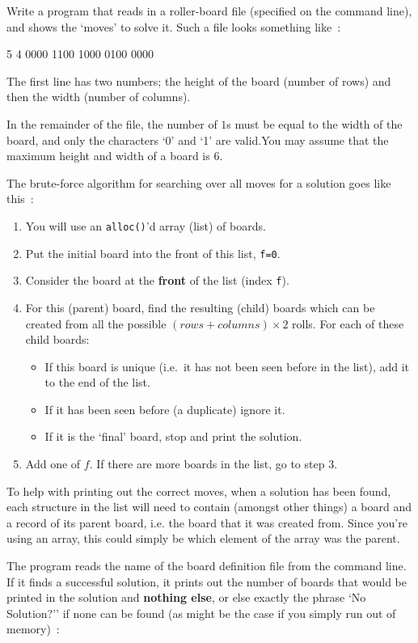 \begin{exercise}
Write a program that reads in a roller-board file (specified on the command line), and shows the `moves' to solve it. Such a file looks something like~:
\begin{terminaloutput}
5 4
0000
1100
1000
0100
0000
\end{terminaloutput}

\noindent The first line has two numbers; the height of
the board (number of rows) and then the width (number of columns).

\noindent
In the remainder of the file, the number of $1$s must be equal to the width of the board, and only the characters `0' and `1' are valid.You may assume that the maximum height and width of a board is $6$.

\noindent
The brute-force algorithm for searching over all moves for a
solution goes like this~:
\begin{enumerate}
\item You will use an \verb^alloc()^'d array (list) of boards.
\item Put the initial board into the front of this list, \verb^f=0^.
\item Consider the board at the {\bf front} of the list (index \verb$f$).
\item For this (parent) board, find the resulting (child) boards 
which can be created from all the possible $(rows + columns) \times 2$ rolls. For each of these child boards:
\begin{itemize}
\item If this board is unique (i.e.\ it has not been seen before in the list), add it to the end of the list.
\item If it has been seen before (a duplicate) ignore it.
\item If it is the `final' board, stop and print the solution.
\end{itemize}
\item Add one of $f$. If there are more boards in the list, go to step $3$.
\end{enumerate}

\noindent To help with printing out the correct moves, when a solution
has been found, each structure in the list will need to contain (amongst
other things) a board and a record of its parent board, i.e. the board
that it was created from. Since you're using an array, this could simply
be which element of the array was the parent.

\noindent The program reads the name of the board definition file from
the command line.  If it finds a successful solution, it prints out the
number of boards that would be printed in the solution and {\bf nothing
else}, or else exactly the phrase `No Solution?'' if none can be found
(as might be the case if you simply run out of memory)~:


\end{exercise}
